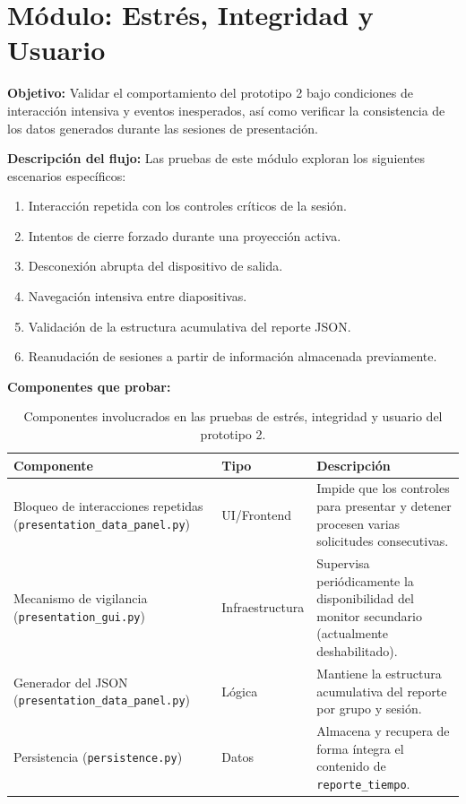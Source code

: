 \documentclass[12pt,letterpaper]{article}
\begin{document}
\clearpage
\section*{Módulo: Estrés, Integridad y Usuario}

\textbf{Objetivo:} Validar el comportamiento del prototipo 2 bajo condiciones de interacción intensiva y eventos inesperados, así como verificar la consistencia de los datos generados durante las sesiones de presentación.

\textbf{Descripción del flujo:} Las pruebas de este módulo exploran los siguientes escenarios específicos:
\begin{enumerate}
    \item Interacción repetida con los controles críticos de la sesión.
    \item Intentos de cierre forzado durante una proyección activa.
    \item Desconexión abrupta del dispositivo de salida.
    \item Navegación intensiva entre diapositivas.
    \item Validación de la estructura acumulativa del reporte JSON.
    \item Reanudación de sesiones a partir de información almacenada previamente.
\end{enumerate}

\textbf{Componentes que probar:}

\begin{table}[H]
    \centering
    \begin{tabular}{|L{0.34\textwidth}|L{0.18\textwidth}|L{0.38\textwidth}|}
        \hline
        \textbf{Componente} & \textbf{Tipo} & \textbf{Descripción} \\ \hline
        Bloqueo de interacciones repetidas (\texttt{presentation\_data\_panel.py}) & UI/Frontend & Impide que los controles para presentar y detener procesen varias solicitudes consecutivas. \\ \hline
        Mecanismo de vigilancia (\texttt{presentation\_gui.py}) & Infraestructura & Supervisa periódicamente la disponibilidad del monitor secundario (actualmente deshabilitado). \\ \hline
        Generador del JSON (\texttt{presentation\_data\_panel.py}) & Lógica & Mantiene la estructura acumulativa del reporte por grupo y sesión. \\ \hline
        Persistencia (\texttt{persistence.py}) & Datos & Almacena y recupera de forma íntegra el contenido de \texttt{reporte\_tiempo}. \\ \hline
    \end{tabular}
    \caption{Componentes involucrados en las pruebas de estrés, integridad y usuario del prototipo 2.}
    \label{tab:componentes-estres-prototipo-2}
\end{table}
\end{document}
